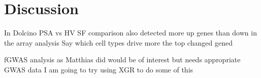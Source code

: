 





\section{Discussion}
%
In Dolcino PSA vs HV SF comparison also detected more up genes than down in the array analysis
Say which cell types drive more the top changed gened

fGWAS analysis as Matthias did would be of interest but needs appropriate GWAS data
I am going to try using XGR to do some of this 


